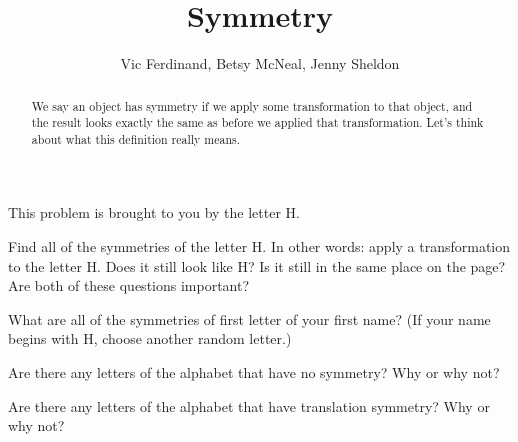 \documentclass{ximera}
\title{Symmetry}
\author{Vic Ferdinand, Betsy McNeal, Jenny Sheldon}
\begin{document}
\begin{abstract}
We say an object has symmetry if we apply some transformation to that object, and the result looks exactly the same as before we applied that transformation.  Let's think about what this definition really means.
\end{abstract}
\maketitle



\begin{problem}
This problem is brought to you by the letter H.

\begin{center}
\end{center}
Find all of the symmetries of the letter H.  In other words: apply a transformation to the letter H.  Does it still look like H?  Is it still in the same place on the page?  Are both of these questions important?


\end{problem}

\begin{problem}
What are all of the symmetries of first letter of your first name?  (If your name begins with H, choose another random letter.)


\end{problem}

\begin{problem} \label{Symmetry3}
Are there any letters of the alphabet that have no symmetry?  Why or why not?

\end{problem}

\begin{problem}
Are there any letters of the alphabet that have translation symmetry?  Why or why not?

\end{problem}
\end{document}
